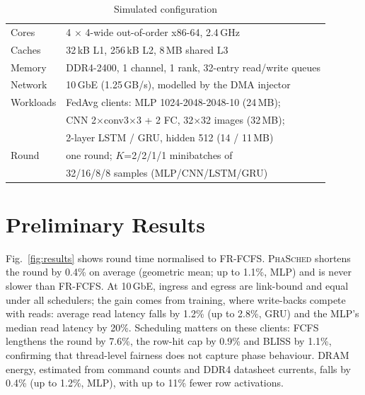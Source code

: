 \documentclass[conference]{IEEEtran}
\newcommand{\name}{\textsc{PhaSched}}
\begin{document}
\begin{table}[t]
\centering
\caption{Simulated configuration}
\label{tab:config}
\footnotesize
\begin{tabular}{@{}ll@{}}
\toprule
Cores & 4 $\times$ 4-wide out-of-order x86-64, 2.4\,GHz \\
Caches & 32\,kB L1, 256\,kB L2, 8\,MB shared L3 \\
Memory & DDR4-2400, 1 channel, 1 rank, 32-entry read/write queues \\
Network & 10\,GbE (1.25\,GB/s), modelled by the DMA injector \\
Workloads & FedAvg clients: MLP 1024-2048-2048-10 (24\,MB); \\
 & CNN 2$\times$conv3$\times$3 + 2 FC, 32$\times$32 images (32\,MB); \\
 & 2-layer LSTM / GRU, hidden 512 (14 / 11\,MB) \\
Round & one round; $K$=2/2/1/1 minibatches of \\
 & 32/16/8/8 samples (MLP/CNN/LSTM/GRU) \\
\bottomrule
\end{tabular}
\end{table}

\section{Preliminary Results}
Fig.~\ref{fig:results} shows round time normalised to FR-FCFS. \name{} shortens the round by 0.4\% on average (geometric mean; up to 1.1\%, MLP) and is never slower than FR-FCFS. At 10\,GbE, ingress and egress are link-bound and equal under all schedulers; the gain comes from training, where write-backs compete with reads: average read latency falls by 1.2\% (up to 2.8\%, GRU) and the MLP's median read latency by 20\%. Scheduling matters on these clients: FCFS lengthens the round by 7.6\%, the row-hit cap by 0.9\% and BLISS by 1.1\%, confirming that thread-level fairness does not capture phase behaviour. DRAM energy, estimated from command counts and DDR4 datasheet currents, falls by 0.4\% (up to 1.2\%, MLP), with up to 11\% fewer row activations.
\end{document}
